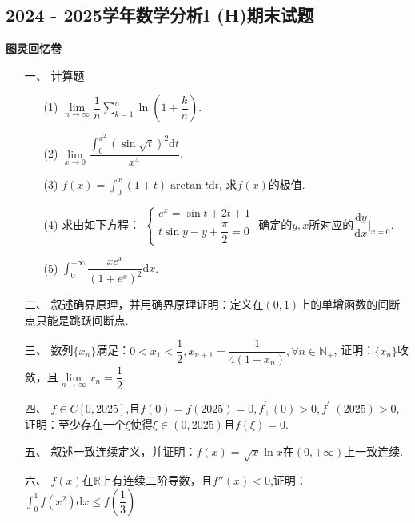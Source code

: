 \documentclass{ctexbook}
\begin{document}
\centering
\subsection*{2024 - 2025学年数学分析I (H)期末试题}
\centering
\textbf{图灵回忆卷}

\begin{enumerate}[leftmargin=*,labelwidth=!,labelsep=0pt]
    \item[一、]计算题
    \begin{enumerate}[leftmargin=*,labelwidth=!,labelsep=0pt]
        \item[(1)] \(\lim\limits_{n\to\infty}\dfrac{1}{n}\displaystyle\sum\limits_{k=1}^{n}\ln\left(1+\dfrac{k}{n}\right)\).
        \item[(2)] \(\lim\limits_{x\to0}\dfrac{\int_{0}^{x^{2}}\left(\sin{\sqrt{t}}\right)^{2} \mathrm{d}t}{x^{4}}\).
        \item[(3)] \(f(x)=\int_{0}^{x}\left(1+t\right)\arctan t \mathrm{d}t\), 求\(f(x)\)的极值.
        \item[(4)] 求由如下方程：
            \(
            \begin{cases}
                e^{x}=\sin t+2t+1\\
                t\sin y-y+\dfrac{\pi}{2}=0
            \end{cases}
            \)
            确定的\(y,x\)所对应的\(\dfrac{\mathrm{d}y}{\mathrm{d}x}\vert_{x = 0}\).
        \item[(5)] \(\int_{0}^{+\infty}\dfrac{xe^{x}}{\left(1+e^{x}\right)^{2}} \mathrm{d}x\).
    \end{enumerate}

    \item[二、]叙述确界原理，并用确界原理证明：定义在\((0,1)\)上的单增函数的间断点只能是跳跃间断点.
    
    \item[三、]数列\(\{x_n\}\)满足：\(0<x_{1}<\dfrac{1}{2},x_{n+1}=\dfrac{1}{4(1-x_{n})},\forall n \in \mathbb{N_+}\),
    证明：\(\{x_n\}\)收敛，且\(\lim\limits_{n\to\infty}x_{n}=\dfrac{1}{2}\).
    
    \item[四、]\(f\in C[0,2025]\),且\(f(0)=f(2025)=0,f_{+}^{\prime}(0)>0,f_{-}^{\prime}(2025)>0\),
    证明：至少存在一个\(\xi\)使得\(\xi\in(0,2025)\)且\(f(\xi)=0\).

    \item[五、]叙述一致连续定义，并证明：\(f(x)=\sqrt{x}\ln x\)在\((0,+\infty)\)上一致连续.
    
    \item[六、]\(f(x)\)在\(\mathbb{R}\)上有连续二阶导数，且\(f''(x)<0\),证明：\(\int_{0}^{1}f(x^{2}) \mathrm{d}x\leq f(\dfrac{1}{3})\).
    

\end{enumerate}
\end{document}
